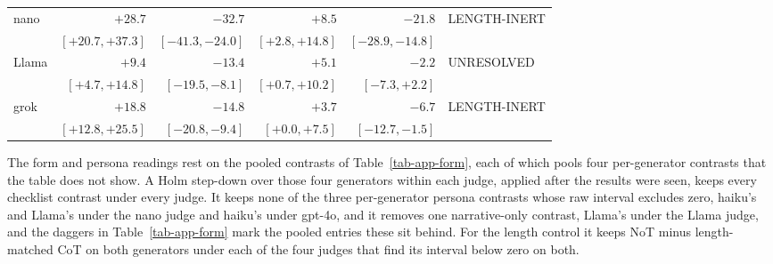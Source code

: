 \begin{table}[tp]
{\begin{tabular}{@{}lrrrrl@{}}
nano & $+28.7$ & $-32.7$ & $+8.5$ & $-21.8$ & LENGTH-INERT \\
 & $[+20.7, +37.3]$ & $[-41.3, -24.0]$ & $[+2.8, +14.8]$ & $[-28.9, -14.8]$ & \\[1pt]
Llama & $+9.4$ & $-13.4$ & $+5.1$ & $-2.2$ & UNRESOLVED \\
 & $[+4.7, +14.8]$ & $[-19.5, -8.1]$ & $[+0.7, +10.2]$ & $[-7.3, +2.2]$ & \\[1pt]
grok & $+18.8$ & $-14.8$ & $+3.7$ & $-6.7$ & LENGTH-INERT \\
 & $[+12.8, +25.5]$ & $[-20.8, -9.4]$ & $[+0.0, +7.5]$ & $[-12.7, -1.5]$ & \\[1pt]
\bottomrule
\end{tabular}}
\end{table}

The form and persona readings rest on the pooled contrasts of
Table~\ref{tab-app-form}, each of which pools four per-generator contrasts
that the table does not show. A Holm step-down over those four generators
within each judge, applied after the results were seen, keeps every
checklist contrast under every judge. It keeps none of the three
per-generator persona contrasts whose raw interval excludes zero, haiku's and
Llama's under the nano judge and haiku's under gpt-4o, and it removes one
narrative-only contrast, Llama's under the Llama judge, and the daggers in
Table~\ref{tab-app-form} mark the pooled entries these sit behind. For the
length control it keeps NoT minus length-matched CoT on both generators under
each of the four judges that find its interval below zero on both.


